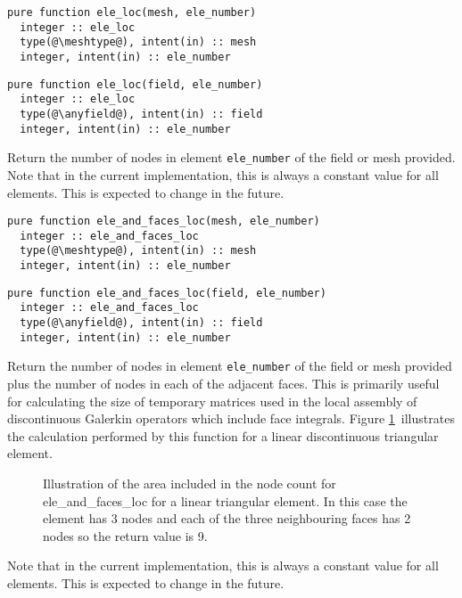 \documentclass[a4paper, 11pt]{book}
\newcommand{\ifhtlatex}[2]{\ifthenelse{\boolean{HTLatex}}{#1}{#2}}
\newcommand{\xfig}[1]{
  \ifhtlatex{
    \texttt{[image: \#1.png]}
  }{
    
  }
}
\begin{document}

\begin{lstlisting}
pure function ele_loc(mesh, ele_number)
  integer :: ele_loc
  type(@\meshtype@), intent(in) :: mesh
  integer, intent(in) :: ele_number
\end{lstlisting}

\begin{lstlisting}
pure function ele_loc(field, ele_number)
  integer :: ele_loc
  type(@\anyfield@), intent(in) :: field
  integer, intent(in) :: ele_number
\end{lstlisting}

Return the number of nodes in element \lstinline+ele_number+ of the field
or mesh provided. Note that in the current implementation, this is always a
constant value for all elements. This is expected to change in the future.


\begin{lstlisting}
pure function ele_and_faces_loc(mesh, ele_number)
  integer :: ele_and_faces_loc
  type(@\meshtype@), intent(in) :: mesh
  integer, intent(in) :: ele_number
\end{lstlisting}

\begin{lstlisting}
pure function ele_and_faces_loc(field, ele_number)
  integer :: ele_and_faces_loc
  type(@\anyfield@), intent(in) :: field
  integer, intent(in) :: ele_number
\end{lstlisting}

Return the number of nodes in element \lstinline+ele_number+ of the field
or mesh provided plus the number of nodes in each of the adjacent
faces. This is primarily useful for calculating the size of temporary
matrices used in the local assembly of discontinuous Galerkin operators
which include face integrals. Figure \ref{fig:elefacesloc}\ illustrates the
calculation performed by this function for a linear discontinuous triangular
element.

\begin{figure}[ht]
  \centering
  \xfig{cq_stencil}
  \caption{Illustration of the area included in the node count for
    ele\_and\_faces\_loc for a linear triangular element. In this case the
    element has 3 nodes and each of the three neighbouring faces has 2 nodes
    so the return value is 9.}
  \label{fig:elefacesloc}
\end{figure}
Note that in the current implementation, this is always a
constant value for all elements. This is expected to change in the future.
\end{document}

